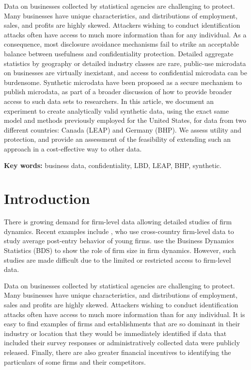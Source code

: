 \documentclass[10pt]{article}
\begin{document}
\begin{addmargin}[6mm]{6mm}
\begin{small}
\begin{singlespace}

Data on businesses collected by statistical agencies are challenging to protect. Many businesses have unique characteristics, and distributions of employment, sales, and profits are highly skewed. Attackers wishing to conduct identification attacks often have access to much more information than for any individual. As a consequence, most disclosure avoidance mechanisms  fail to strike an acceptable balance between usefulness and confidentiality protection. Detailed aggregate statistics by geography or detailed industry classes are rare, public-use microdata on businesses are virtually inexistant, and access to confidential microdata can be burdensome. 
Synthetic microdata have been proposed as a secure mechanism to publish microdata, as part of a broader discussion of how  to provide broader access to such data sets to researchers.
In this article, we document an experiment to create analytically valid synthetic data, using the exact same model and methods previously employed for the United States, for data from two different countries: Canada (\ac{LEAP}) and Germany (\ac{BHP}). We assess utility and protection, and provide an assessment of the feasibility of extending such an approach in a cost-effective way to other data.

\smallskip \noindent \textbf{Key words:} business data, confidentiality, LBD, LEAP, BHP, synthetic.

\end{singlespace}
\end{small}
\end{addmargin}

\smallskip
\acresetall
\section{Introduction}
There is growing demand for firm-level data allowing detailed studies of firm dynamics. Recent examples include \textcite{NBERc0480}, who use cross-country firm-level data to study average post-entry behavior of young firms. \textcite{10.1257/aer.20141280} use the Business Dynamics Statistics (BDS) to show the role of firm size in firm dynamics. However, such studies are made difficult due to the limited or restricted access to firm-level data.

Data on businesses collected by statistical agencies are challenging to protect. Many businesses have unique characteristics, and distributions of employment, sales and profits are highly skewed. Attackers wishing to conduct identification attacks often have access to much more information than for any individual. It is easy to find examples of firms and establishments that are so dominant in their industry or location that they would be immediately identified if data that included their survey responses or administratively collected data were publicly released.  Finally, there are also greater financial incentives to identifying the particulars of some firms and their competitors.
\end{document}
